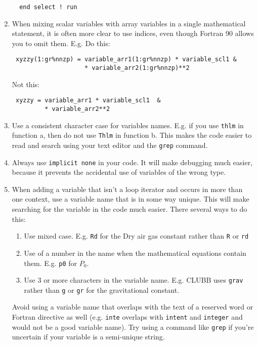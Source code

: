 \documentclass[letterpaper,12pt]{article}
\begin{document}
\begin{enumerate}
\begin{verbatim}
  end select ! run

\end{verbatim}

\item When mixing scalar variables with array variables in a single
mathematical statement, it is often more clear to use indices, even
though Fortran 90 allows you to omit them. \newline
E.g. Do this:

\begin{verbatim}
 xyzzy(1:gr%nnzp) = variable_arr1(1:gr%nnzp) * variable_scl1 &
                    * variable_arr2(1:gr%nnzp)**2
\end{verbatim}

Not this:
\begin{verbatim}
 xyzzy = variable_arr1 * variable_scl1  &
         * variable_arr2**2
\end{verbatim}

\item Use a consistent character case for variables names. 
E.g. if you use \texttt{thlm} in function a, then do not use \texttt{Thlm} in function b. 
This makes the code easier to read and search using your text editor and the 
\texttt{grep} command.
\newline

\item Always use \texttt{implicit none} in your code.  It will make 
debugging much easier, because it prevents the accidental use of 
variables of the wrong type.
\newline

\item When adding a variable that isn't a loop iterator and occurs in more 
than one context, use a variable name that is in some way unique. 
This will make searching for the variable in the code much easier. 
There several ways to do this:
	\begin{enumerate}
	\item Use mixed case.  E.g. \texttt{Rd} for the Dry air gas constant 
	rather than \texttt{R} or \texttt{rd}
	\item Use of a number in the name when the mathematical equations 
	contain them. 
	 E.g. \texttt{p0} for $P_0$.
	\item Use 3 or more characters in the variable name.
	E.g. CLUBB uses \texttt{grav} 
	rather than \texttt{g} or \texttt{gr} for the gravitational constant.
	\end{enumerate}
Avoid using a variable name that overlaps with the text of a reserved word or
Fortran directive as well (e.g. \texttt{inte} overlaps with \texttt{intent} 
and \texttt{integer} and would not be a good variable name).
Try using a command
like \texttt{grep} if you're uncertain if your variable is a semi-unique string.
\newline


\end{enumerate}
\end{document}
